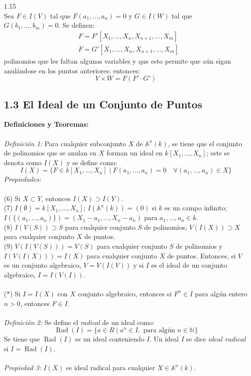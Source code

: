 \documentclass{article}
\newcommand{\A}{\mathbb{A}}
\begin{document}
\\
\\
1.15
\\
Sea $F \in I(V)$ tal que $F(a_1,\dots,a_n)=0$ y $G \in I(W)$ tal que $G(b_1,\dots,b_m)=0$. Se definen:
\begin{equation*}
\begin{aligned}
    &F=F'[X_1,\dots,X_n,X_{n+1},\dots,X_m] \\
    &F=G'[X_1,\dots,X_n,X_{n+1},\dots,X_m]
\end{aligned}
\end{equation*}
polinomios que les faltan algunas variables y que esto permite que aún sigan anulándose en los puntos anteriores; entonces:
\begin{equation*}
    V \times W = F(F' \cdot G')
\end{equation*}
\subsection*{1.3 El Ideal de un Conjunto de Puntos}
\textbf{Definiciones y Teoremas:}
\\
\\
\textit{Definición 1:} Para cualquier subconjunto $X$ de $\A^{n}(k)$, se tiene que el conjunto de polinomios que se anulan en $X$ forman un ideal en $k[X_1 , \dots, X_n]$; este se denota como $I(X)$ y se define como:
\begin{equation*}
    I(X)=\{F \in k[X_1, \dots, X_n] \mid F(a_1, \dots, a_n) =0 \quad \forall (a_1, \dots, a_n) \in X\}
\end{equation*}
\textit{Propiedades:}
\\
\\
(6) Si $X \subset Y$, entonces $I(X) \supset I(Y)$.
\\
(7) $I(\emptyset)=k[X_1 , \dots, X_n]$; $I(\A^{n}(k))=(0)$ si $k$ es un campo infinito; $I(\{(a_1, \dots, a_n) \})=(X_1-a_1, \dots, X_n-a_n)$ para $a_1, \dots, a_n \in k$.
\\
(8) $I(V(S)) \supset S$ para cualquier conjunto $S$ de polinomios; $V(I(X)) \supset X$ para cualquier conjunto $X$ de puntos.
\\
(9) $V(I(V(S)))=V(S)$ para cualquier conjunto $S$ de polinomios y $I(V(I(X)))=I(X)$ para cualquier conjunto $X$ de puntos. Entonces, si $V$ es un conjunto algebraico, $V=V(I(V))$ y si $I$ es el ideal de un conjunto algebraico, $I=I(V(I))$.
\\
\\
(*) Si $I=I(X)$ con $X$ conjunto algebraico, entonces si $F^n \in I$ para algún entero $n>0$, entonces $F \in I$.
\\
\\
\textit{Definición 2:} Se define el \textit{radical} de un ideal como:
\begin{equation*}
    \operatorname{Rad}{(I)}=\{a \in R \mid a^n \in I, \text{ para algún } n \in \mathbb{N} \}
\end{equation*}
Se tiene que $\operatorname{Rad}{(I)}$ es un ideal conteniendo $I$. Un ideal $I$ se dice $\textit{ideal radical}$ si $I=\operatorname{Rad}{(I)}$.
\\
\\
\textit{Propiedad 3:} $I(X)$ es ideal radical para cualquier $X \in \A^{n}(k)$.
\end{document}
